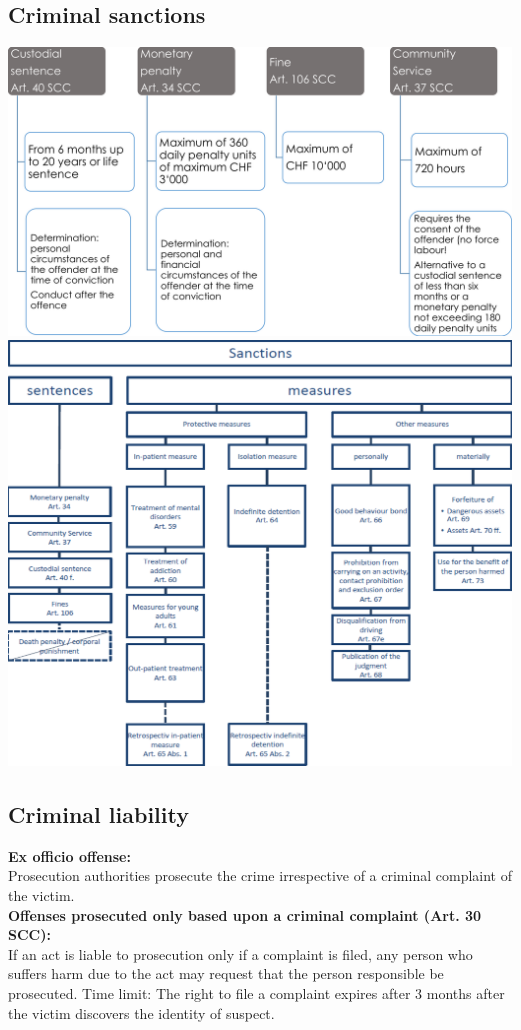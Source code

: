 \subsection{Criminal sanctions}
\includegraphics[width=1\linewidth]{images/criminalsanctions}
\includegraphics[width=1\linewidth]{images/criminalsanctions2}

\subsection{Criminal liability}
\textbf{Ex officio offense:}\\
Prosecution authorities prosecute the crime irrespective of a criminal complaint of the victim.\\
\textbf{Offenses prosecuted only based upon a criminal complaint (Art. 30 SCC):}\\
If an act is liable to prosecution only if a complaint is filed, any person who suffers harm due to the act may request that the person responsible be prosecuted. Time limit: The right to file a complaint expires after 3 months after the victim discovers the identity of suspect.

